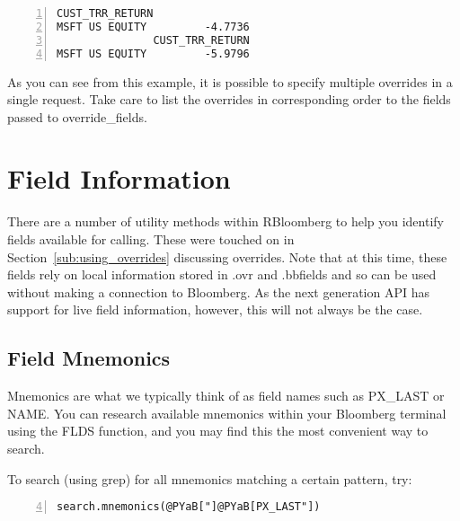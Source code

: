 \documentclass[a4paper]{article}
\begin{document}
    

\begin{Verbatim}[commandchars=@\[\],numbers=left,firstnumber=1,stepnumber=1]
               CUST_TRR_RETURN
MSFT US EQUITY         -4.7736
               CUST_TRR_RETURN
MSFT US EQUITY         -5.9796
\end{Verbatim}

    

As you can see from this example, it is possible to specify multiple overrides in a single request. Take care to list the overrides in corresponding order to the fields passed to override\_fields.



\section{Field Information} %
\label{sec:field_information}

There are a number of utility methods within RBloomberg to help you identify fields available for calling. These were touched on in Section~\ref{sub:using_overrides} discussing overrides. Note that at this time, these fields rely on local information stored in .ovr and .bbfields and so can be used without making a connection to Bloomberg. As the next generation API has support for live field information, however, this will not always be the case.

\subsection{Field Mnemonics} %
\label{sub:field_mnemonics}

Mnemonics are what we typically think of as field names such as PX\_LAST or NAME. You can research available mnemonics within your Bloomberg terminal using the FLDS function, and you may find this the most convenient way to search.

To search (using grep) for all mnemonics matching a certain pattern, try:

\begin{Verbatim}[commandchars=@\[\],numbers=left,firstnumber=4,stepnumber=1]
search.mnemonics(@PYaB["]@PYaB[PX_LAST"])
\end{Verbatim}

    
\end{document}
